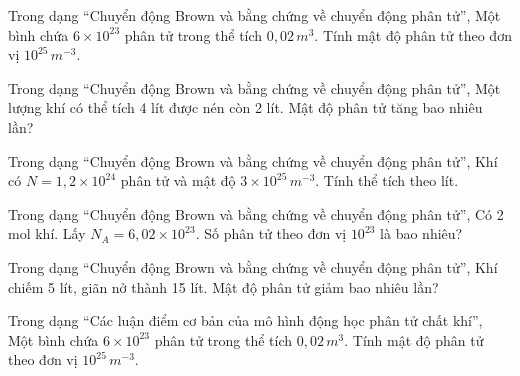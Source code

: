\begin{ex}
Trong dạng “Chuyển động Brown và bằng chứng về chuyển động phân tử”, Một bình chứa $6\times10^{23}$ phân tử trong thể tích $0,02\,m^3$. Tính mật độ phân tử theo đơn vị $10^{25}\,m^{-3}$.
\end{ex}

\begin{ex}
Trong dạng “Chuyển động Brown và bằng chứng về chuyển động phân tử”, Một lượng khí có thể tích 4 lít được nén còn 2 lít. Mật độ phân tử tăng bao nhiêu lần?
\end{ex}

\begin{ex}
Trong dạng “Chuyển động Brown và bằng chứng về chuyển động phân tử”, Khí có $N=1,2\times10^{24}$ phân tử và mật độ $3\times10^{25}\,m^{-3}$. Tính thể tích theo lít.
\end{ex}

\begin{ex}
Trong dạng “Chuyển động Brown và bằng chứng về chuyển động phân tử”, Có 2 mol khí. Lấy $N_A=6,02\times10^{23}$. Số phân tử theo đơn vị $10^{23}$ là bao nhiêu?
\end{ex}

\begin{ex}
Trong dạng “Chuyển động Brown và bằng chứng về chuyển động phân tử”, Khí chiếm 5 lít, giãn nở thành 15 lít. Mật độ phân tử giảm bao nhiêu lần?
\end{ex}

\begin{ex}
Trong dạng “Các luận điểm cơ bản của mô hình động học phân tử chất khí”, Một bình chứa $6\times10^{23}$ phân tử trong thể tích $0,02\,m^3$. Tính mật độ phân tử theo đơn vị $10^{25}\,m^{-3}$.
\end{ex}

